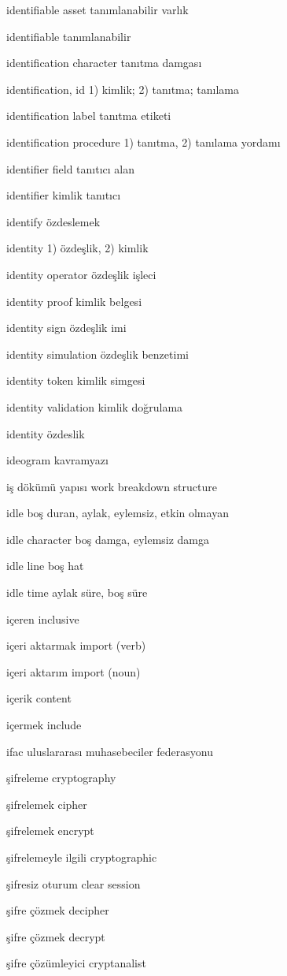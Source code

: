 \documentclass[12pt,fleqn]{article}\usepackage{../../common}
\begin{document}
identifiable asset tanımlanabilir varlık

identifiable tanımlanabilir

identification character tanıtma damgası

identification, id 1) kimlik; 2) tanıtma; tanılama

identification label tanıtma etiketi

identification procedure 1) tanıtma, 2) tanılama yordamı

identifier field tanıtıcı alan

identifier kimlik tanıtıcı

identify özdeslemek

identity 1) özdeşlik, 2) kimlik

identity operator özdeşlik işleci

identity proof kimlik belgesi

identity sign özdeşlik imi

identity simulation özdeşlik benzetimi

identity token kimlik simgesi

identity validation kimlik doğrulama

identity özdeslik

ideogram kavramyazı

iş dökümü yapısı work breakdown structure

idle boş duran, aylak, eylemsiz, etkin olmayan

idle character boş damga, eylemsiz damga

idle line boş hat

idle time aylak süre, boş süre

içeren inclusive

içeri aktarmak import (verb)

içeri aktarım import (noun)

içerik content

içermek include

ifac uluslararası muhasebeciler federasyonu

şifreleme cryptography

şifrelemek cipher

şifrelemek encrypt

şifrelemeyle ilgili cryptographic

şifresiz oturum clear session

şifre çözmek decipher

şifre çözmek decrypt

şifre çözümleyici cryptanalist
\end{document}
